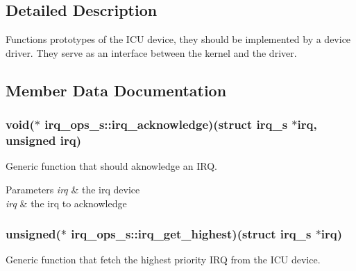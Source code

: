 \subsection{Detailed Description}
Functions prototypes of the I\-C\-U device, they should be implemented by a device driver. They serve as an interface between the kernel and the driver. 

\subsection{Member Data Documentation}
\hypertarget{structirq__ops__s_a2dffdb09714e3498b8962381d71718c5}{
\subsubsection[{irq\-\_\-acknowledge}]{\setlength{\rightskip}{0pt plus 5cm}void($\ast$ irq\-\_\-ops\-\_\-s\-::irq\-\_\-acknowledge)(struct {\bf irq\-\_\-s} $\ast$irq, unsigned irq)}}\label{structirq__ops__s_a2dffdb09714e3498b8962381d71718c5}


Generic function that should aknowledge an I\-R\-Q. 


\begin{DoxyParams}{Parameters}
{\em irq} & the irq device \\
\hline
{\em irq} & the irq to acknowledge \\
\hline
\end{DoxyParams}
\hypertarget{structirq__ops__s_a1ef2b203959777a212125e1ea0d4d79c}{
\subsubsection[{irq\-\_\-get\-\_\-highest}]{\setlength{\rightskip}{0pt plus 5cm}unsigned($\ast$ irq\-\_\-ops\-\_\-s\-::irq\-\_\-get\-\_\-highest)(struct {\bf irq\-\_\-s} $\ast$irq)}}\label{structirq__ops__s_a1ef2b203959777a212125e1ea0d4d79c}


Generic function that fetch the highest priority I\-R\-Q from the I\-C\-U device. 


